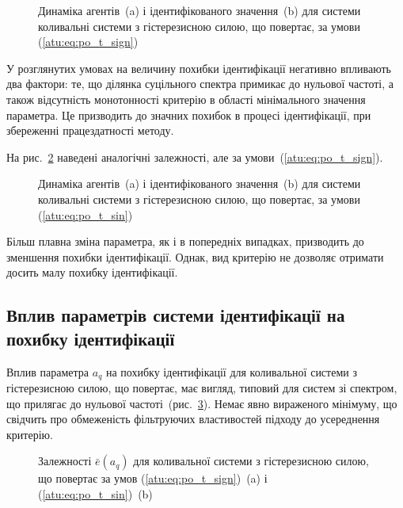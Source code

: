 \begin{figure}[htb!]
  \caption{Динаміка агентів~(a) і ідентифікованого значення~(b) для системи коливальні системи з гістерезисною силою, що повертає, за умови (\ref{atu:eq:po_t_sign})}
\label{atu:f:vg_id_sign}
\end{figure}

У розглянутих умовах на величину похибки ідентифікації
негативно впливають два фактори: те, що ділянка суцільного спектра примикає до нульової частоті,
а також відсутність монотонності
критерію в області мінімального значення параметра. Це
призводить до значних похибок в процесі ідентифікації, при
збереженні працездатності методу.


На рис.~\ref{atu:f:vg_id_sin} наведені аналогічні залежності, але за
умови~(\ref{atu:eq:po_t_sign}).

\begin{figure}[htb!]
  \caption{Динаміка агентів~(a) і ідентифікованого значення~(b) для системи коливальні системи з гістерезисною силою, що повертає, за умови (\ref{atu:eq:po_t_sin})}
\label{atu:f:vg_id_sin}
\end{figure}

Більш плавна зміна параметра, як і в попередніх випадках,
призводить до зменшення похибки ідентифікації. Однак,
вид критерію не дозволяє отримати досить малу похибку
ідентифікації.




\subsection{Вплив параметрів системи ідентифікації на похибку ідентифікації} %

Вплив параметра
$ a_q $ на похибку ідентифікації для коливальної системи з
гістерезисною силою, що повертає, має вигляд, типовий для систем зі
спектром, що прилягає до нульової частоті~(рис.~\ref{atu:f:vg_e_a_q}). Немає
явно вираженого мінімуму, що свідчить про обмеженість
фільтруючих властивостей підходу до усереднення критерію.

\begin{figure}[htb!]
  \caption{Залежності $\bar{e}(a_q) $ для коливальної системи з гістерезисною силою, що повертає за умов (\ref{atu:eq:po_t_sign})~(a) і (\ref{atu:eq:po_t_sin})~(b)}
\label{atu:f:vg_e_a_q}
\end{figure}

